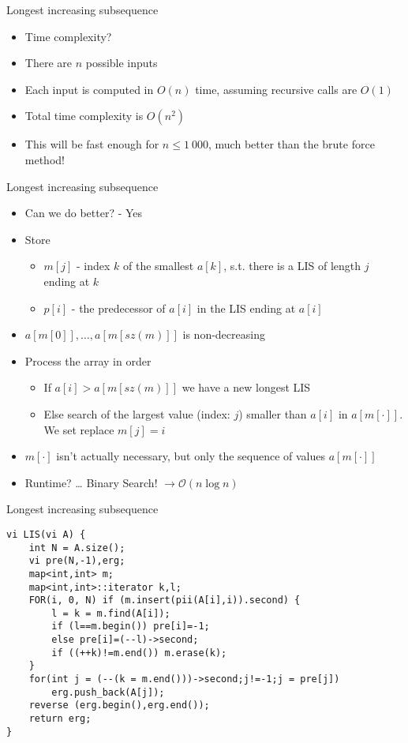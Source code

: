 \documentclass[12pt,t]{beamer}
\newcommand{\bi}{\begin{itemize}}
\newcommand{\ei}{\end{itemize}}
\begin{document}
\begin{frame}{Longest increasing subsequence}
    \vspace{30pt}
    \bi
        \item Time complexity? \pause
            \vspace{10pt}
        \item There are $n$ possible inputs
        \item Each input is computed in $O(n)$ time, assuming recursive calls are $O(1)$
        \item Total time complexity is $O(n^2)$
            \vspace{10pt}
        \item This will be fast enough for $n \leq 1\ 000$, much better than the brute force method!
    \ei
\end{frame}

\begin{frame}{Longest increasing subsequence}
    \vspace{20pt}
    \bi
      \item Can we do better? \pause - Yes
      \item Store 
      \bi
    \item $m[j]$ - index $k$ of the smallest $a[k]$, s.t. there is a LIS of length $j$ ending at $k$
    \item $p[i]$ - the predecessor of $a[i]$ in the LIS ending at $a[i]$
      \ei
      \item $a[m[0]],\dots,a[m[sz(m)]]$ is non-decreasing
      \item Process the array in order
      \bi
    \item If $a[i] > a[m[sz(m)]]$ we have a new longest LIS
    \item Else search of the largest value (index: $j$) smaller than $a[i]$ in $a[m[\cdot]]$. We set replace $m[j] = i$
      \ei
      \item $m[\cdot]$ isn't actually necessary, but only the sequence of values $a[m[\cdot]]$
      \item Runtime? \pause \dots{} Binary Search! $\rightarrow \mathcal O(n \log n)$
    \ei
\end{frame}


\begin{frame}[fragile]{Longest increasing subsequence}
    \begin{verbatim}
vi LIS(vi A) {
    int N = A.size();
    vi pre(N,-1),erg;
    map<int,int> m;
    map<int,int>::iterator k,l;
    FOR(i, 0, N) if (m.insert(pii(A[i],i)).second) {
        l = k = m.find(A[i]);
        if (l==m.begin()) pre[i]=-1;
        else pre[i]=(--l)->second;
        if ((++k)!=m.end()) m.erase(k);
    }
    for(int j = (--(k = m.end()))->second;j!=-1;j = pre[j])
        erg.push_back(A[j]);
    reverse (erg.begin(),erg.end());
    return erg;
}
    \end{verbatim}
\end{frame}
\end{document}
